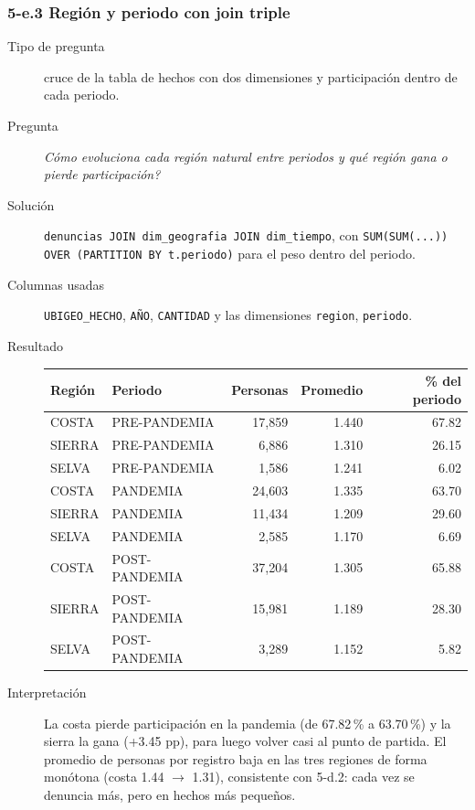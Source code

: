 \subsubsection*{5-e.3 \textbar{} Regi\'on y periodo con join triple}
\begin{description}
\item[Tipo de pregunta] cruce de la tabla de hechos con dos dimensiones y participaci\'on dentro
      de cada periodo.
\item[Pregunta] \emph{C\'omo evoluciona cada regi\'on natural entre periodos y qu\'e regi\'on
      gana o pierde participaci\'on?}
\item[Soluci\'on] \texttt{denuncias JOIN dim\_geografia JOIN dim\_tiempo}, con
      \texttt{SUM(SUM(...)) OVER (PARTITION BY t.periodo)} para el peso dentro del periodo.
\item[Columnas usadas] \texttt{UBIGEO\_HECHO}, \texttt{A\~NO}, \texttt{CANTIDAD} y las
      dimensiones \texttt{region}, \texttt{periodo}.
\item[Resultado]
\begin{center}
\begin{tabular}{llrrr}
\toprule
Regi\'on & Periodo & Personas & Promedio & \% del periodo\\
\midrule
COSTA & PRE-PANDEMIA & 17,859 & 1.440 & 67.82\\
SIERRA & PRE-PANDEMIA & 6,886 & 1.310 & 26.15\\
SELVA & PRE-PANDEMIA & 1,586 & 1.241 & 6.02\\
COSTA & PANDEMIA & 24,603 & 1.335 & 63.70\\
SIERRA & PANDEMIA & 11,434 & 1.209 & 29.60\\
SELVA & PANDEMIA & 2,585 & 1.170 & 6.69\\
COSTA & POST-PANDEMIA & 37,204 & 1.305 & 65.88\\
SIERRA & POST-PANDEMIA & 15,981 & 1.189 & 28.30\\
SELVA & POST-PANDEMIA & 3,289 & 1.152 & 5.82\\
\bottomrule
\end{tabular}
\end{center}
\item[Interpretaci\'on] La costa pierde participaci\'on en la pandemia (de 67.82\,\% a 63.70\,\%)
      y la sierra la gana (+3.45 pp), para luego volver casi al punto de partida. El promedio de
      personas por registro baja en las tres regiones de forma mon\'otona (costa 1.44 $\to$ 1.31),
      consistente con 5-d.2: cada vez se denuncia m\'as, pero en hechos m\'as peque\~nos.
\end{description}

